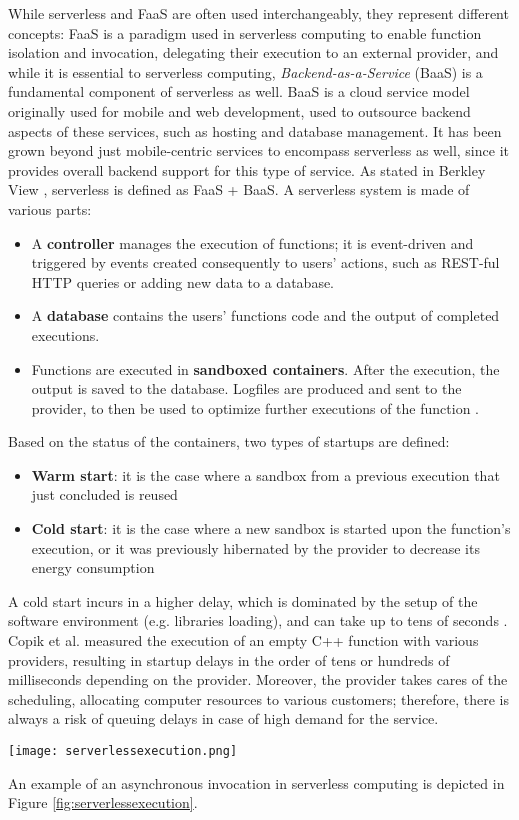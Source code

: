 \documentclass[
	a4paper, %
	12pt,
	twoside, %
]{LTJournalArticle}
\begin{document}
While serverless and FaaS are often used interchangeably, they represent different concepts: FaaS is a paradigm used in serverless computing to enable function isolation and invocation, delegating their execution to an external provider, and while it is essential to serverless computing, \textit{Backend-as-a-Service} (BaaS) is a fundamental component of serverless as well. BaaS is a cloud service model originally used for mobile and web development, used to outsource backend aspects of these services, such as hosting and database management. It has been grown beyond just mobile-centric services to encompass serverless as well, since it provides overall backend support for this type of service. As stated in Berkley View \cite{jonas_cloud_2019}, serverless is defined as FaaS + BaaS. A serverless system is made of various parts:

\begin{itemize}
	\item A \textbf{controller} manages the execution of functions; it is event-driven and triggered by events created consequently to users' actions, such as REST-ful HTTP queries or adding new data to a database.
	\item A \textbf{database} contains the users' functions code and the output of completed executions.
	\item Functions are executed in \textbf{sandboxed containers}. After the execution, the output is saved to the database. Logfiles are produced and sent to the provider, to then be used to optimize further executions of the function \cite{shafiei_serverless_2022}.
\end{itemize}
Based on the status of the containers, two types of startups are defined:

\begin{itemize}
	\item \textbf{Warm start}: it is the case where a sandbox from a previous execution that just concluded is reused
	\item \textbf{Cold start}: it is the case where a new sandbox is started upon the function's execution, or it was previously hibernated by the provider to decrease its energy consumption
\end{itemize}
A cold start incurs in a higher delay, which is dominated by the setup of the software environment (e.g. libraries loading), and can take up to tens of seconds \cite{jonas_cloud_2019}. Copik et al. \cite{copik_rfaas_2023} measured the execution of an empty C++ function with various providers, resulting in startup delays in the order of tens or hundreds of milliseconds depending on the provider. Moreover, the provider takes cares of the scheduling, allocating computer resources to various customers; therefore, there is always a risk of queuing delays in case of high demand for the service.
\begin{figure*}[!htb]
	\texttt{[image: serverlessexecution.png]}
	\caption{Example of an asynchronous invocation. Source: \cite{li_serverless_2022}}
	\label{fig:serverlessexecution}
\end{figure*}
An example of an asynchronous invocation in serverless computing is depicted in Figure \ref{fig:serverlessexecution}. 
\end{document}
